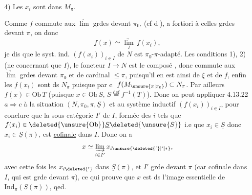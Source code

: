 4) Les $x_i$ sont dans $M_\pi$.

Comme $f$ commute aux $\underrightarrow{\lim}$ grdes devant $\pi_0$,  (cf \textcircled{d}), a fortiori à celles grdes devant $\pi$, on  donc
\[
f(x)\simeq\underset I{\underrightarrow{\lim}}\,f(x_i),
\]
je dis que le syst. ind. $(f(x_i))_{i\in I}$ de $N$ est $\pi_0$-$\pi$-adapté. Les conditions 1), 2)  (ne concernant que $I$), le foncteur $I\longrightarrow N$ est le composé
, donc commute aux $\underrightarrow{\lim}$ grdes devant $\pi_0$ et de cardinal $\leq\pi$, puisqu'il en est ainsi de $\xi$ et de $f$, enfin les $f(x_i)$ sont ds $N_\pi$ puisque par \textcircled{c} $f(M_{\unsure{\pi|\pi_0}})\subset N_\pi$.
Par ailleurs $f(x)\in\mathrm{Ob}\,\underline T$ (puisque $x\in\underline{\mathrm{Ob}}\,\underline S$,  $\underline S\overset{\mathrm{def}}{=}f^{-1}(\underline T)$). Donc on peut appliquer 4.13.22 $a\Longrightarrow c$ à la situation $(N,\pi_0,\pi,\underline S)$ et au système inductif $(f(x_i))_{i\in I}$, pour conclure que la sous-catégorie $I'$ de $I$, formée des $i$ tels que $f(x_i)\in\deleted{\unsure{\mathrm{Ob}}}\underline S\deleted{\unsure{S}}$ i.e  que $x_i\in\underline S$ donc $x_i\in\underline S(\pi)$, est \uline{cofinale} dans $I$. Donc on a
\[
x\simeq\underset{i\in I'}{\underrightarrow{\lim}}\,x_{i\unsure{\deleted{{}'}|{}'|\ast}},
\]
avec cette fois les $x_{i\deleted{{}'}}$ dans $\underline S(\pi)$, et $I'$ grde devant $\pi$ (car cofinale  dans $I$, qui est grde devant $\pi$), ce qui prouve que $x$ est ds l'image essentielle de $\mathrm{Ind}_\pi(\underline S(\pi))$, qed.

